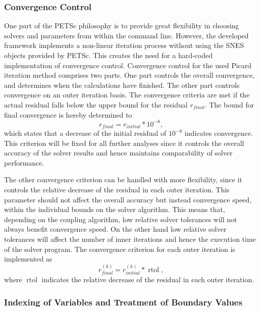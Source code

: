 \subsubsection{Convergence Control} 
\label{sec:convergence}
One part of the PETSc philosophy is to provide great flexibility in choosing solvers and parameters from within the command line. However, the developed framework implements a non-linear iteration process without using the SNES objects provided by PETSc. This creates the need for a hard-coded implementation of convergence control. Convergence control for the used Picard iteration method comprises two parts. One part controls the overall convergence, and determines when the calculations have finished. The other part controls convergence on an outer iteration basis. The convergence criteria are met if the actual residual falls below the upper bound for the residual \(r_{final}\). The bound for final convergence is hereby determined to
\begin{displaymath}
  r_{final} = r_{initial} * 10^{-8},
\end{displaymath}
which states that a decrease of the initial residual of \(10^{-8}\) indicates convergence. This criterion will be fixed for all further analyses since it controls the overall accuracy of the solver results and hence maintains comparability of solver performance. 

The other convergence criterion can be handled with more flexibility, since it controls the relative decrease of the residual in each outer iteration. This parameter should not affect the overall accuracy but instead convergence speed, within the individual bounds on the solver algorithm. This means that, depending on the coupling algorithm, low relative solver tolerances will not always benefit convergence speed. On the other hand low relative solver tolerances will affect the number of inner iterations and hence the execution time of the solver program. The convergence criterion for each outer iteration is implemented as
\begin{displaymath}
  r_{final}^{(k)} = r_{initial}^{(k)} * \operatorname{rtol},
\end{displaymath}
where \(\operatorname{rtol}\) indicates the relative decrease of the residual in each outer iteration. 

\subsubsection{Indexing of Variables and Treatment of Boundary Values}

